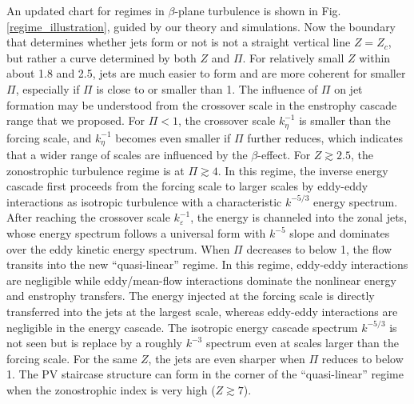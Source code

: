 \documentclass{ametsoc}
\begin{document}
An updated chart for regimes in $\beta$-plane turbulence is shown
in Fig. \ref{regime_illustration}, guided by our theory and simulations.
Now the boundary that determines whether jets form or not is not a
straight vertical line $Z=Z_{c}$, but rather a curve determined by
both $Z$ and $\Pi$. For relatively small $Z$ within about 1.8 and
2.5, jets are much easier to form and are more coherent for smaller
$\Pi$, especially if $\Pi$ is close to or smaller than 1. The influence
of $\Pi$ on jet formation may be understood from the crossover scale
in the enstrophy cascade range that we proposed. For $\Pi<1$, the
crossover scale $k_{\eta}^{-1}$ is smaller than the forcing scale,
and $k_{\eta}^{-1}$ becomes even smaller if $\Pi$ further reduces,
which indicates that a wider range of scales are influenced by the $\beta$-effect.
For $Z\apprge2.5$, the zonostrophic turbulence regime is at $\Pi\apprge4$.
In this regime, the inverse energy cascade first proceeds from the
forcing scale to larger scales by eddy-eddy interactions as isotropic
turbulence with a characteristic $k^{-5/3}$ energy spectrum. After
reaching the crossover scale $k_{\varepsilon}^{-1}$, the energy is
channeled into the zonal jets, whose energy spectrum follows a universal
form with $k^{-5}$ slope and dominates over the eddy kinetic energy
spectrum. When $\Pi$ decreases to below 1, the flow transits into
the new ``quasi-linear'' regime. In this regime, eddy-eddy interactions
are negligible while eddy/mean-flow interactions dominate the nonlinear
energy and enstrophy transfers. The energy injected at the forcing
scale is directly transferred into the jets at the largest scale, whereas
eddy-eddy interactions are negligible in the energy cascade. The isotropic
energy cascade spectrum $k^{-5/3}$ is not seen but is replace by
a roughly $k^{-3}$ spectrum even at scales larger than the forcing
scale. For the same $Z$, the jets are even sharper when $\Pi$ reduces
to below 1. The PV staircase structure can form in the corner of the
``quasi-linear'' regime when the zonostrophic index is very high
($Z\apprge7$).
\end{document}
